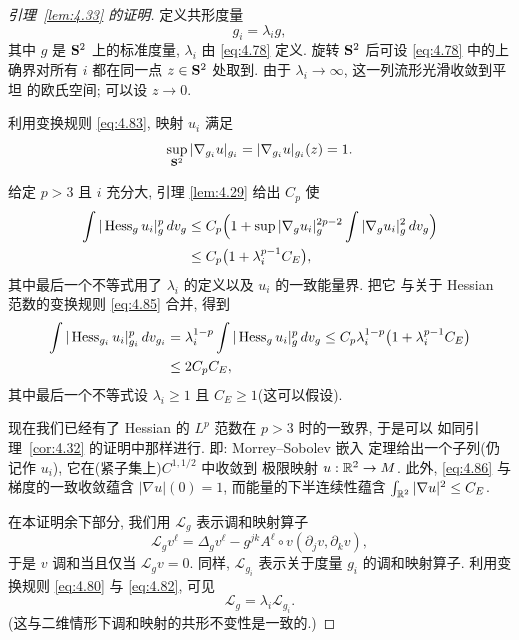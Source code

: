 \begin{proof}[引理~\ref{lem:4.33} 的证明]
定义共形度量
\begin{equation*}
g_i=\lambda_ig,
\end{equation*}
其中 $g$ 是 $\mathbf{S}^2$ 上的标准度量, $\lambda_i$ 由 \eqref{eq:4.78} 定义.
旋转 $\mathbf{S}^2$ 后可设 \eqref{eq:4.78} 中的上确界对所有 $i$ 都在同一点
$z\in\mathbf{S}^2$ 处取到. 由于 $\lambda_i\to\infty$, 这一列流形光滑收敛到平坦
的欧氏空间; 可以设 $z\to0$.

利用变换规则 \eqref{eq:4.83}, 映射 $u_i$ 满足
\begin{equation}
\sup_{\mathbf{S}^2}|\nabla_{g_i}u|_{g_i}=|\nabla_{g_i}u|_{g_i}(z)=1.
\label{eq:4.86}
\end{equation}

给定 $p>3$ 且 $i$ 充分大, 引理 \ref{lem:4.29} 给出 $C_p$ 使
\begin{equation*}
\begin{aligned}
\int|\operatorname{Hess}_gu_i|_g^p\,dv_g
&\leq C_p\Bigl(1+\sup|\nabla_gu_i|_g^{2p-2}
 \int|\nabla_gu_i|_g^2\,dv_g\Bigr)\\
&\leq C_p\bigl(1+\lambda_i^{p-1}C_E\bigr),
\end{aligned}
\end{equation*}
其中最后一个不等式用了 $\lambda_i$ 的定义以及 $u_i$ 的一致能量界. 把它
与关于 Hessian 范数的变换规则 \eqref{eq:4.85} 合并, 得到
\begin{equation}
\begin{aligned}
\int|\operatorname{Hess}_{g_i}u_i|_{g_i}^p\,dv_{g_i}
&=\lambda_i^{1-p}\int|\operatorname{Hess}_gu_i|_g^p\,dv_g
 \leq C_p\lambda_i^{1-p}\bigl(1+\lambda_i^{p-1}C_E\bigr)\\
&\leq 2C_pC_E,
\end{aligned}
\label{eq:4.87}
\end{equation}
其中最后一个不等式设 $\lambda_i\geq1$ 且 $C_E\geq1$(这可以假设).

现在我们已经有了 Hessian 的 $L^p$ 范数在 $p>3$ 时的一致界, 于是可以
如同引理~\ref{cor:4.32} 的证明中那样进行. 即: Morrey--Sobolev 嵌入
定理给出一个子列(仍记作 $u_i$), 它在(紧子集上)$C^{1,1/2}$ 中收敛到
极限映射 $u:\mathbb{R}^2\to M$. 此外, \eqref{eq:4.86} 与梯度的一致收敛蕴含
$|\nabla u|(0)=1$, 而能量的下半连续性蕴含
$\int_{\mathbb{R}^2}|\nabla u|^2\leq C_E$.

在本证明余下部分, 我们用 $\mathcal{L}_g$ 表示调和映射算子
\begin{equation*}
\mathcal{L}_gv^\ell
 =\Delta_gv^\ell-g^{jk}A^\ell\circ v(\partial_jv,\partial_kv),
\end{equation*}
于是 $v$ 调和当且仅当 $\mathcal{L}_gv=0$. 同样, $\mathcal{L}_{g_i}$
表示关于度量 $g_i$ 的调和映射算子. 利用变换规则 \eqref{eq:4.80} 与
\eqref{eq:4.82}, 可见
\begin{equation*}
\mathcal{L}_g=\lambda_i\mathcal{L}_{g_i}.
\end{equation*}
(这与二维情形下调和映射的共形不变性是一致的.)


\end{proof}
